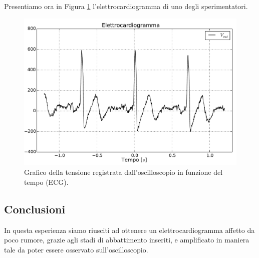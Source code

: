Presentiamo ora in Figura \ref{fig7:ecg_output} l'elettrocardiogramma di uno degli sperimentatori.

\begin{figure}[htpc]
\centering
\includegraphics[width=.7\textwidth]{../E07/latex/g4.pdf}
\caption{Grafico della tensione registrata dall'oscilloscopio in funzione del tempo (ECG).}
\label{fig7:ecg_output}
\end{figure}

\subsection*{Conclusioni}
In questa esperienza siamo riusciti ad ottenere un elettrocardiogramma affetto da poco rumore, grazie agli stadi di abbattimento inseriti, e amplificato in maniera tale da poter essere osservato sull'oscilloscopio.
